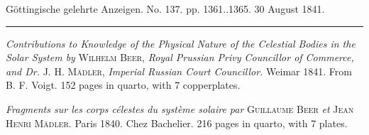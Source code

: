 \clearpage
{}
\hypertarget{native-657-lower}{}
\begin{center}\small Göttingische gelehrte Anzeigen. No. 137. pp. 1361..1365. 30 August 1841.\\[3pt]\rule{.72\linewidth}{.3pt}\end{center}

\emph{Contributions to Knowledge of the Physical Nature of the Celestial Bodies in the Solar System by} \textsc{Wilhelm Beer}, \emph{Royal Prussian Privy Councillor of Commerce, and Dr.} J. H. \textsc{Mädler}, \emph{Imperial Russian Court Councillor.} Weimar 1841. From B. F. Voigt. 152 pages in quarto, with 7 copperplates.

\emph{Fragments sur les corps célestes du système solaire par} \textsc{Guillaume Beer} \emph{et} \textsc{Jean Henri Mädler.} Paris 1840. Chez Bachelier. 216 pages in quarto, with 7 plates.

